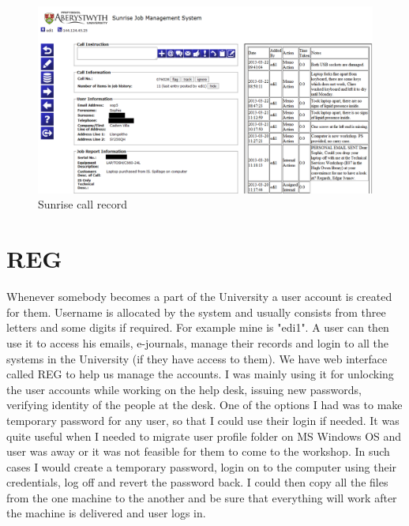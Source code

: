\documentclass[10pt,a4paper,headinclude=true,twoside]{report}
\begin{document}
\begin{figure}[H]
\centering
\centerline{\includegraphics[scale=0.5]{./sunrise_job}}
\caption{Sunrise call record}
\label{fig:sunrise_job}
\end{figure}

\section{REG}
Whenever somebody becomes a part of the University a user account is created for them. Username is allocated by the system and usually consists from three letters and some digits if required. For example mine is "edi1". A user can then use it to access his emails, e-journals, manage their records and login to all the systems in the University (if they have access to them). We have web interface called REG to help us manage the accounts. I was mainly using it for unlocking the user accounts while working on the help desk, issuing new passwords, verifying identity of the people at the desk. One of the options I had was to make temporary password for any user, so that I could use their login if needed. It was quite useful when I needed to migrate user profile folder on MS Windows OS and user was away or it was not feasible for them to come to the workshop. In such cases I would create a temporary password, login on to the computer using their credentials, log off and revert the password back. I could then copy all the files from the one machine to the another and be sure that everything will work after the machine is delivered and user logs in.
\end{document}
